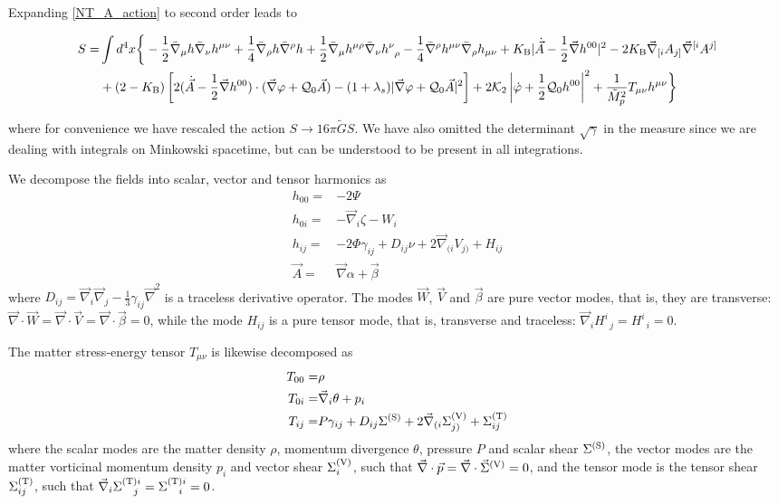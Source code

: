 \documentclass[twocolumn,prd,preprintnumbers,amsmath,amssymb,nofootinbib,superscriptaddress]{revtex4-1}
\newcommand{\scal}{\ensuremath{{\rm S}}}
\newcommand{\vect}{\ensuremath{{\rm V}}}
\newcommand{\tens}{\ensuremath{{\rm T}}}
\newcommand{\nablab}{\bar{\nabla}}
\newcommand{\grad}{\ensuremath{\vec{\nabla}}}
\newcommand{\lambdas}{\lambda_s}
\newcommand{\Kcal}{{\cal K}}
\newcommand{\Mpt}{\tilde{M}_p}
\newcommand{\Qcal}{{\cal Q}}
\newcommand{\KB}{\ensuremath{K_{{\rm B}}}}
\begin{document}
Expanding \eqref{NT_A_action} to second order
leads to
\begin{widetext}
\begin{align}
S =&  \int d^4x \bigg\{ - \frac{1}{2} \nablab_\mu h \nablab_\nu h^{\mu\nu}
+ \frac{1}{4}  \nablab_\rho h \nablab^\rho h
+ \frac{1}{2} \nablab_{\mu} h^{\mu\rho}  \nablab_\nu h^\nu_{\;\;\rho}
- \frac{1}{4} \nablab^\rho h^{\mu\nu}  \nablab_\rho  h_{\mu\nu}
+ \KB |\dot{\vec{A}} - \frac{1}{2} \grad h^{00}|^2
- 2\KB \grad_{[i} A_{j]} \grad^{[i} A^{j]}
\nonumber
\\
&
+  \left(2 - \KB\right)\left[  2(  \dot{\vec{A}}  -  \frac{1}{2}  \grad h^{00} ) \cdot ( \grad \varphi + \Qcal_0 \vec{A} ) 
- ( 1 + \lambdas )  |\grad\varphi + \Qcal_0 \vec{A}|^2
\right]
+2 \Kcal_2  \left|\dot{\varphi} +  \frac{1}{2}\Qcal_0 h^{00} \right|^2
 +  \frac{1}{\Mpt^2} T_{\mu\nu} h^{\mu\nu}
 \bigg\}
\label{Minkowski_action}
\end{align}
\end{widetext}
where for convenience we have rescaled the action $S \rightarrow 16\pi \tilde{G}S$. We have also omitted the determinant $\sqrt{\gamma}$ in the measure since
we are dealing with integrals on Minkowski spacetime, but can be understood to be present in all integrations.

We decompose the fields into scalar, vector and tensor harmonics as
\begin{align}
h_{00} =&  -2\Psi 
\\
h_{0i} =&  - \grad_i \zeta -  W_i
\\
h_{ij} =&  -2\Phi \gamma_{ij} +   D_{ij} \nu + 2\grad_{(i}V_{j)} + H_{ij} 
\\
\vec{A} =& \grad \alpha + \vec{\beta}
\end{align}
where $D_{ij} = \grad_i\grad_j-\frac{1}{3}\gamma_{ij}\grad^2$ is a traceless derivative operator. The modes $\vec{W}$, $\vec{V}$ and $\vec{\beta}$ are pure vector modes, that is, they are 
transverse: $\grad \cdot \vec{W} = \grad \cdot \vec{V} = \grad \cdot \vec{\beta} = 0$, while the mode $H_{ij}$ is a pure tensor mode, that is, transverse and traceless: $\grad_i H^i_{\;\;j} = H^i_{\;\;i} = 0$.

The matter stress-energy tensor $T_{\mu\nu}$ is likewise decomposed as
\begin{align}
T_{00} =&  \rho
\\
T_{0i} =&  \grad_i \theta +  p_i
\\
T_{ij} =&  P \gamma_{ij} +   D_{ij} \Sigma^{(\scal)} + 2 \grad_{(i} \Sigma^{(\vect)}_{j)} + \Sigma^{(\tens)}_{ij}
\end{align}
where the scalar modes are the matter density $\rho$, momentum divergence $\theta$, pressure $P$ and scalar shear $\Sigma^{(\scal)}$, 
the vector modes are the matter vorticinal momentum density $p_i$ and vector shear $\Sigma^{(\vect)}_i$, such that $\grad \cdot \vec{p} = \grad\cdot \vec{\Sigma}^{(\vect)} = 0$, 
and the tensor mode is the tensor shear $\Sigma^{(\tens)}_{ij}$, such that $\grad_i \Sigma^{(\tens)i}_{\;\;\;\;j} = \Sigma^{(\tens)i}_{\;\;\;\;i} = 0$.
\end{document}
